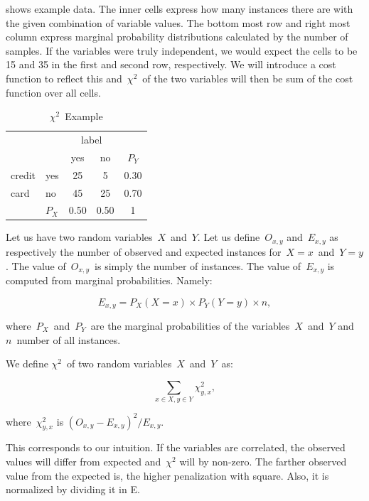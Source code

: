  shows example data.
The inner cells express how many instances there are with the given combination of variable values.
The bottom most row and right most column express marginal probability distributions
calculated by the number of samples.
If the variables were truly independent,
we would expect the cells to be 15 and 35 in the first and second row, respectively.
We will introduce a cost function to reflect this
and~$\chi^2$~of the two variables will then be sum of the cost function over all cells.


\begin{table}[h!]
 \center
 \begin{tabular}{ll|c|c|c}
 \cline{3-4}
        &       & \multicolumn{2}{c|}{label} & \\
        \cline{3-4}
        &       & yes        & no            & $P_Y$ \\
        \cline{1-4}
	 \multicolumn{1}{|l|}{credit} & yes   & 25         & 5             & 0.30 \\
        \cline{2-4}
	 \multicolumn{1}{|l|}{card}   & no    & 45         & 25            & 0.70 \\
        \cline{1-4}
		& \multicolumn{1}{l}{$P_X$} & \multicolumn{1}{l}{0.50}       & \multicolumn{1}{l}{0.50}          & 1
 
 \end{tabular}
 \caption{$\chi^2$~Example}
 \label{tab:chi_ex}
\end{table}

Let us have two random variables~$X$~and~$Y$.
Let us define~$O_{x,y}$ and~$E_{x,y}$
as respectively the number of observed and expected instances for~$X=x$~and~$Y=y$.
The value of~$O_{x,y}$~is simply the number of instances.
The value of~$E_{x,y}$ is computed from marginal probabilities.
Namely:

\begin{equation}
E_{x,y} = P_X(X=x) \times P_Y(Y=y) \times n,
\end{equation}

where~$P_X$~and~$P_Y$~are the marginal probabilities of the variables~$X$~and~$Y$
and~$n$~number of all instances.

We define $\chi^2$~of two random variables~$X$~and~$Y$~as:

$$\sum_{x \in X, y \in Y}{\chi^2_{y,x}},$$

where~${\chi^2_{y,x}}$ is $\left(O_{x,y} - E_{x,y} \right)^ 2 / E_{x,y}$.

This corresponds to our intuition.
If the variables are correlated,
the observed values will differ from expected and~$\chi^2$ will by non-zero.
The farther observed value from the expected is, the higher penalization with square.
Also, it is normalized by dividing it in E.

